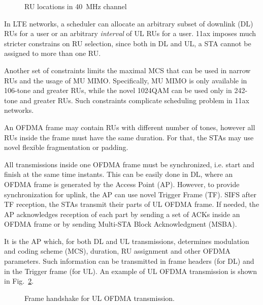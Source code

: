 \begin{figure}[tb]
	\centering
	
	\caption{\label{fig:resource_units} RU locations in \SI{40}{\MHz} channel}
\vspace{-0.5em}
\end{figure}

In LTE networks, a scheduler can allocate an arbitrary subset of downlink (DL) RUs for a user or an arbitrary \emph{interval} of UL RUs for a user.
11ax imposes much stricter constrains on RU selection, since both in DL and UL, a STA cannot be assigned to more than one RU.

Another set of constraints limits the maximal MCS that can be used in narrow RUs and the usage of MU MIMO.
Specifically, MU MIMO is only available in 106-tone and greater RUs, while the novel 1024QAM can be used only in 242-tone and greater RUs.
Such constraints complicate scheduling problem in 11ax networks.

An OFDMA frame may contain RUs with different number of tones, however all RUs inside the frame must have the same duration.
For that, the STAs may use novel flexible fragmentation or padding. 

All transmissions inside one OFDMA frame must be synchronized, i.e. start and finish at the same time instants.
This can be easily done in DL, where an OFDMA frame is generated by the Access Point (AP).
However, to provide synchronization for uplink, the AP can use novel Trigger Frame (TF).
SIFS after TF reception, the STAs transmit their parts of UL OFDMA frame.
If needed, the AP acknowledges reception of each part by sending a set of ACKs inside an OFDMA frame or by sending Multi-STA Block Acknowledgment (MSBA).

It is the AP which, for both DL and UL transmissions, determines modulation and coding scheme (MCS), duration, RU assignment and other OFDMA parameters. Such information can be transmitted in frame headers (for DL) and in the Trigger frame (for UL). An example of UL OFDMA transmission is shown in Fig.~\ref{fig:transmission}. 

\begin{figure}[tb]
	\centering{
		}
	\caption{\label{fig:transmission} Frame handshake for UL OFDMA transmission.}
\vspace{-0.5em}
\end{figure}

